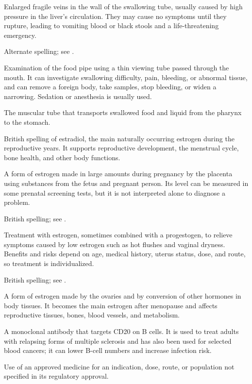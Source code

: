  Enlarged fragile veins in the wall of the swallowing tube, usually caused by high pressure in the liver’s circulation. They may cause no symptoms until they rupture, leading to vomiting blood or black stools and a life-threatening emergency.

 Alternate spelling; see .

 Examination of the food pipe using a thin viewing tube passed through the mouth. It can investigate swallowing difficulty, pain, bleeding, or abnormal tissue, and can remove a foreign body, take samples, stop bleeding, or widen a narrowing. Sedation or anesthesia is usually used.

 The muscular tube that transports swallowed food and liquid from the pharynx to the stomach.

 British spelling of estradiol, the main naturally occurring estrogen during the reproductive years. It supports reproductive development, the menstrual cycle, bone health, and other body functions.

 A form of estrogen made in large amounts during pregnancy by the placenta using substances from the fetus and pregnant person. Its level can be measured in some prenatal screening tests, but it is not interpreted alone to diagnose a problem.

 British spelling; see .

 Treatment with estrogen, sometimes combined with a progestogen, to relieve symptoms caused by low estrogen such as hot flushes and vaginal dryness. Benefits and risks depend on age, medical history, uterus status, dose, and route, so treatment is individualized.

 British spelling; see .

 A form of estrogen made by the ovaries and by conversion of other hormones in body tissues. It becomes the main estrogen after menopause and affects reproductive tissues, bones, blood vessels, and metabolism.

 A monoclonal antibody that targets CD20 on B cells. It is used to treat adults with relapsing forms of multiple sclerosis and has also been used for selected blood cancers; it can lower B-cell numbers and increase infection risk.

 Use of an approved medicine for an indication, dose, route, or population not specified in its regulatory approval.

